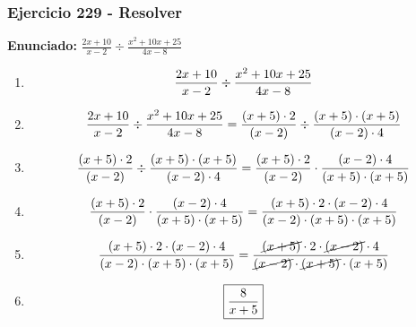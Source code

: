 \documentclass[11pt,a4paper]{article}
\newcommand{\fitmath}[1]{%
\[
\setbox0=\hbox{$\displaystyle #1$}%
\ifdim\wd0>\linewidth
\resizebox{\linewidth}{!}{$\displaystyle #1$}%
\else
#1%
\fi
\]
}
\begin{document}
\subsubsection*{Ejercicio 229 - Resolver}
\textbf{Enunciado:} $ \frac{2 x + 10}{x - 2} \div \frac{x^{2} + 10 x + 25}{4 x - 8} $\par
\begin{enumerate}[leftmargin=2em]
\item \fitmath{\frac{2 x + 10}{x - 2} \div \frac{x^{2} + 10 x + 25}{4 x - 8}}
\item \fitmath{\frac{2 x + 10}{x - 2} \div \frac{x^{2} + 10 x + 25}{4 x - 8}= \frac{\left(x + 5\right)\cdot 2}{\left(x - 2\right)} \div \frac{\left(x + 5\right)\cdot \left(x + 5\right)}{\left(x - 2\right)\cdot 4}}
\item \fitmath{\frac{\left(x + 5\right)\cdot 2}{\left(x - 2\right)}\div \frac{\left(x + 5\right)\cdot \left(x + 5\right)}{\left(x - 2\right)\cdot 4}= \frac{\left(x + 5\right)\cdot 2}{\left(x - 2\right)}\cdot \frac{\left(x - 2\right)\cdot 4}{\left(x + 5\right)\cdot \left(x + 5\right)}}
\item \fitmath{\frac{\left(x + 5\right)\cdot 2}{\left(x - 2\right)}\cdot \frac{\left(x - 2\right)\cdot 4}{\left(x + 5\right)\cdot \left(x + 5\right)}= \frac{\left(x + 5\right)\cdot 2\cdot \left(x - 2\right)\cdot 4}{\left(x - 2\right)\cdot \left(x + 5\right)\cdot \left(x + 5\right)}}
\item \fitmath{\frac{\left(x + 5\right)\cdot 2\cdot \left(x - 2\right)\cdot 4}{\left(x - 2\right)\cdot \left(x + 5\right)\cdot \left(x + 5\right)}= \frac{\cancel{\left(x + 5\right)}\cdot 2\cdot \cancel{\left(x - 2\right)}\cdot 4}{\cancel{\left(x - 2\right)}\cdot \cancel{\left(x + 5\right)}\cdot \left(x + 5\right)}}
\item \fitmath{\boxed{\frac{8}{x + 5}}}
\end{enumerate}

\vspace{0.12cm}
\end{document}
